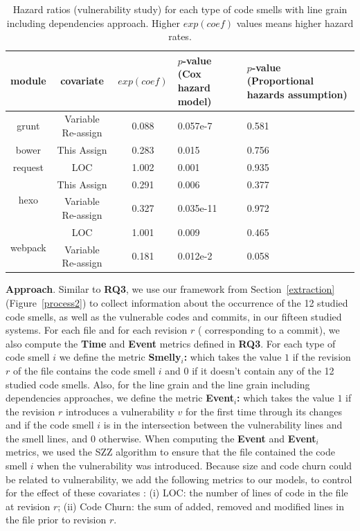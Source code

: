 {\begin{table}[t]
\end{table}

\begin{table}[t]
	\centering
	\scriptsize
	\caption{Hazard ratios (vulnerability study) for each type of code smells with line grain including dependencies approach. Higher $exp(coef)$ values means higher hazard rates.}
	\begin{tabular}{c|c|c|p{2cm}|p{2cm}}
		\hline
		module & covariate & $exp(coef)$ & $p$-value (Cox hazard model) & $p$-value (Proportional hazards assumption) \\ \hline
		\multirow{1}{*}{grunt} 
		& Variable Re-assign & 0.088 & 0.057e-7 & 0.581 \\ \hline
		\multirow{1}{*}{bower}
		& This Assign & 0.283 & 0.015 & 0.756 \\ \hline
		\multirow{1}{*}{request}
		& LOC & 1.002 & 0.001 & 0.935 \\ \hline
		\multirow{2}{*}{hexo}
		& This Assign & 0.291 & 0.006 & 0.377 \\ \cline{2-5}
		& Variable Re-assign & 0.327 & 0.035e-11 & 0.972 \\ \hline
		\multirow{2}{*}{webpack}
		& LOC & 1.001 & 0.009 & 0.465 \\ \cline{2-5}
		& Variable Re-assign & 0.181 & 0.012e-2 & 0.058 \\ \hline
	\end{tabular}
	\label{smelltypes6}

\end{table}

\textbf{Approach}. Similar to \textbf{RQ3}, we use our framework from Section~\ref{extraction} (Figure~\ref{process2}) to collect information about the occurrence of the 12 studied code smells, as well as the vulnerable codes and commits, in our fifteen studied systems. For each file and for each revision $r$ (\ie{} corresponding to a commit), we also compute the \textbf{Time} and \textbf{Event} metrics defined in \textbf{RQ3}. For each type of code smell $i$ we define the metric \textbf{Smelly$_{i}$:} which takes the value $1$ if the revision $r$ of the file contains the code smell $i$ and $0$ if it doesn't contain any of the 12 studied code smells. Also, for the line grain and the line grain including dependencies approaches, we define the metric \textbf{Event$_{i}$:} which takes the value $1$ if the revision $r$ introduces a vulnerability $v$ for the first time through its changes and if the code smell $i$ is in the intersection between the vulnerability lines and the smell lines, and $0$ otherwise. When computing the \textbf{Event} and \textbf{Event$_{i}$} metrics, we used the SZZ algorithm to ensure that the file contained the code smell $i$ when the vulnerability was introduced.
Because size and code churn could be related to vulnerability, we add the following metrics to our models, to control for the effect of these covariates : (i) LOC: the number of lines of code in the file at revision $r$; (ii) Code Churn: the sum of added, removed and modified lines in the file prior to revision $r$.

}
